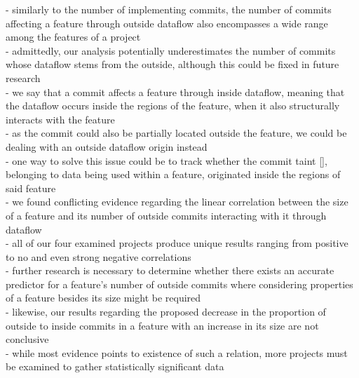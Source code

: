 - similarly to the number of implementing commits, the number of commits affecting a feature through outside dataflow also encompasses a wide range among the features of a project \\
- admittedly, our analysis potentially underestimates the number of commits whose dataflow stems from the outside, although this could be fixed in future research \\
- we say that a commit affects a feature through inside dataflow, meaning that the dataflow occurs inside the regions of the feature, when it also structurally interacts with the feature \\
- as the commit could also be partially located outside the feature, we could be dealing with an outside dataflow origin instead \\
- one way to solve this issue could be to track whether the commit taint \ref{}, belonging to data being used within a feature, originated inside the regions of said feature \\
- we found conflicting evidence regarding the linear correlation between the size of a feature and its number of outside commits interacting with it through dataflow \\
- all of our four examined projects produce unique results ranging from positive to no and even strong negative correlations \\
- further research is necessary to determine whether there exists an accurate predictor for a feature's number of outside commits where considering properties of a feature besides its size might be required \\
- likewise, our results regarding the proposed decrease in the proportion of outside to inside commits in a feature with an increase in its size are not conclusive \\
- while most evidence points to existence of such a relation, more projects must be examined to gather statistically significant data \\

